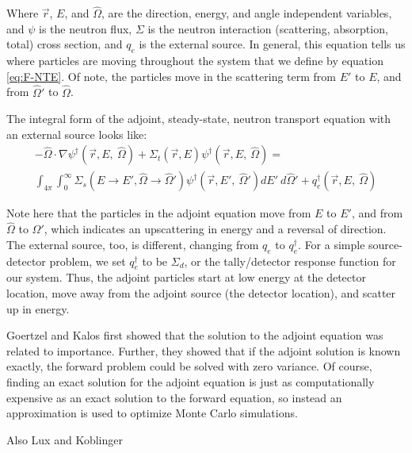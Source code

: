Where $\vec { r }$, $E$, and $\hat\Omega$, are the direction, energy, and angle independent variables, and $\psi$ is the neutron flux, $\Sigma$ is the neutron interaction (scattering, absorption, total) cross section, and $q_{e}$ is the external source. In general, this equation tells us where particles are moving throughout the system that we define by equation \ref{eq:F-NTE}. Of note, the particles move in the scattering term from $E'$ to $E$, and from $\hat\Omega'$ to $\hat\Omega$.

The integral form of the adjoint, steady-state, neutron transport equation with an external source looks like:
\begin{multline}
-\hat\Omega \cdot \nabla \psi^{\dagger} (\vec {r} ,E,\:\hat\Omega)+\Sigma _{ t }(\vec{r},E)\psi^{\dagger}  (\vec { r } ,E,\:\hat\Omega)
= \\
 \int _{ 4\pi  } \int _{ 0 }^{ \infty  } \Sigma _{ s }(E\rightarrow E', \hat\Omega\rightarrow\hat\Omega')\psi^{\dagger}  (\vec { r } ,E',\: \hat\Omega')dE' \:d\hat\Omega' + q_{e}^\dagger(\vec { r } ,E, \:\hat\Omega)
\label{eq:A-NTE}
\end{multline}


Note here that the particles in the adjoint equation move from $E$ to $E'$, and from $\hat\Omega$ to $\hat\Omega'$, which indicates an upscattering in energy and a reversal of direction. The external source, too, is different, changing from $q_{e}$ to $q_{e}^\dagger$. For a simple source-detector problem, we set $q_{e}^\dagger$ to be $\Sigma _{ d }$, or the tally/detector response function for our system. Thus, the adjoint particles start at low energy at the detector location, move away from the adjoint source (the detector location), and scatter up in energy.

Goertzel \cite{goertzel_monte_1958} and Kalos \cite{kalos_importance_1963} first showed that the solution to the adjoint equation was related to importance. Further, they showed that if the adjoint solution is known exactly, the forward problem could be solved with zero variance. Of course, finding an exact solution for the adjoint equation is just as computationally expensive as an exact solution to the forward equation, so instead an approximation is used to optimize Monte Carlo simulations.

Also Lux and Koblinger \cite{lux_monte_carlo}

